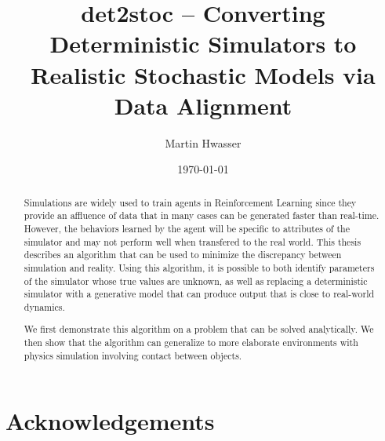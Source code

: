 \documentclass{kththesis}
\title{det2stoc -- Converting Deterministic Simulators to Realistic Stochastic Models via Data Alignment}
\author{Martin Hwasser}
\date{\today}
\begin{document}
\frontmatter
\titlepage
\begin{abstract}
Simulations are widely used to train agents in Reinforcement Learning since they provide an affluence of data that in many cases can be generated faster than real-time. However, the behaviors learned by the agent will be specific to attributes of the simulator and may not perform well when transfered to the real world. This thesis describes an algorithm that can be used to minimize the discrepancy between simulation and reality. Using this algorithm, it is possible to both identify parameters of the simulator whose true values are unknown, as well as replacing a deterministic simulator with a generative model that can produce output that is close to real-world dynamics.

We first demonstrate this algorithm on a problem that can be solved analytically. We then show that the algorithm can generalize to more elaborate environments with physics simulation involving contact between objects.

\end{abstract}
\begin{otherlanguage}{swedish}
  \begin{abstract}
  \end{abstract}
\end{otherlanguage}

\section*{Acknowledgements}


\tableofcontents
\mainmatter







 

\printbibliography[heading=bibintoc]

\appendix


\tailmatter
\end{document}
